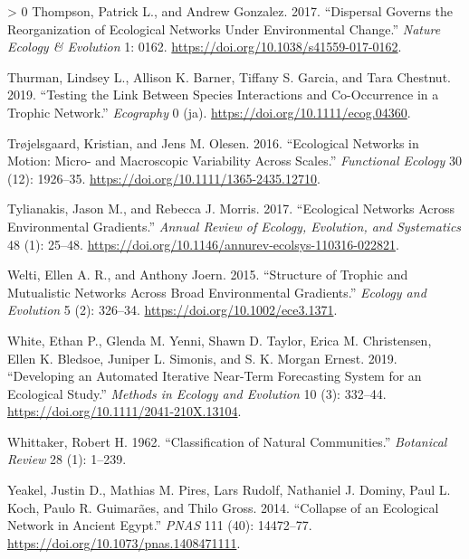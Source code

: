 \documentclass[10pt,oneside]{article}
\newlength{\cslhangindent}
\newenvironment{CSLReferences}[3] %
 {%
  \setlength{\parindent}{0pt}
  \ifodd #1 \everypar{\setlength{\hangindent}{\cslhangindent}}\ignorespaces\fi
  \ifnum #2 > 0
  \setlength{\parskip}{#2\baselineskip}
  \fi
 }%
 {}
\begin{document}
\begin{CSLReferences}{1}{0}
\leavevmode\hypertarget{ref-Thompson2017DisGov}{}%
Thompson, Patrick L., and Andrew Gonzalez. 2017. {``Dispersal Governs
the Reorganization of Ecological Networks Under Environmental Change.''}
\emph{Nature Ecology \& Evolution} 1: 0162.
\url{https://doi.org/10.1038/s41559-017-0162}.

\leavevmode\hypertarget{ref-Thurman2019TesLin}{}%
Thurman, Lindsey L., Allison K. Barner, Tiffany S. Garcia, and Tara
Chestnut. 2019. {``Testing the Link Between Species Interactions and
Co-Occurrence in a Trophic Network.''} \emph{Ecography} 0 (ja).
\url{https://doi.org/10.1111/ecog.04360}.

\leavevmode\hypertarget{ref-Trojelsgaard2016EcoNet}{}%
Trøjelsgaard, Kristian, and Jens M. Olesen. 2016. {``Ecological Networks
in Motion: Micro- and Macroscopic Variability Across Scales.''}
\emph{Functional Ecology} 30 (12): 1926--35.
\url{https://doi.org/10.1111/1365-2435.12710}.

\leavevmode\hypertarget{ref-Tylianakis2017EcoNet}{}%
Tylianakis, Jason M., and Rebecca J. Morris. 2017. {``Ecological
Networks Across Environmental Gradients.''} \emph{Annual Review of
Ecology, Evolution, and Systematics} 48 (1): 25--48.
\url{https://doi.org/10.1146/annurev-ecolsys-110316-022821}.

\leavevmode\hypertarget{ref-Welti2015StrTro}{}%
Welti, Ellen A. R., and Anthony Joern. 2015. {``Structure of Trophic and
Mutualistic Networks Across Broad Environmental Gradients.''}
\emph{Ecology and Evolution} 5 (2): 326--34.
\url{https://doi.org/10.1002/ece3.1371}.

\leavevmode\hypertarget{ref-White2019DevAut}{}%
White, Ethan P., Glenda M. Yenni, Shawn D. Taylor, Erica M. Christensen,
Ellen K. Bledsoe, Juniper L. Simonis, and S. K. Morgan Ernest. 2019.
{``Developing an Automated Iterative Near-Term Forecasting System for an
Ecological Study.''} \emph{Methods in Ecology and Evolution} 10 (3):
332--44. \url{https://doi.org/10.1111/2041-210X.13104}.

\leavevmode\hypertarget{ref-Whittaker1962ClaNat}{}%
Whittaker, Robert H. 1962. {``Classification of Natural Communities.''}
\emph{Botanical Review} 28 (1): 1--239.

\leavevmode\hypertarget{ref-Yeakel2014ColEco}{}%
Yeakel, Justin D., Mathias M. Pires, Lars Rudolf, Nathaniel J. Dominy,
Paul L. Koch, Paulo R. Guimarães, and Thilo Gross. 2014. {``Collapse of
an Ecological Network in Ancient Egypt.''} \emph{PNAS} 111 (40):
14472--77. \url{https://doi.org/10.1073/pnas.1408471111}.


\end{CSLReferences}
\end{document}

